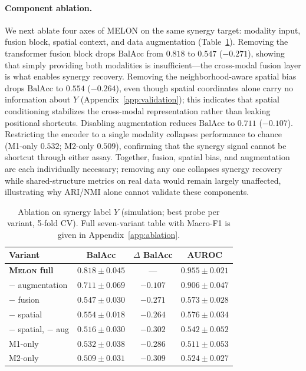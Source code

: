 \documentclass{article}
\theoremstyle{plain}
\theoremstyle{definition}
\newcommand{\melon}{\textsc{Melon}}
\begin{document}
\paragraph{Component ablation.}
We next ablate four axes of MELON on the same synergy target: modality input, fusion block, spatial context, and data augmentation (Table~\ref{tab:sim-ablation}). Removing the transformer fusion block drops $\text{BalAcc}$ from $0.818$ to $0.547$ ($-0.271$), showing that simply providing both modalities is insufficient—the cross-modal fusion layer is what enables synergy recovery. Removing the neighborhood-aware spatial bias drops $\text{BalAcc}$ to $0.554$ ($-0.264$), even though spatial coordinates alone carry no information about $Y$ (Appendix~\ref{app:validation}); this indicates that spatial conditioning stabilizes the cross-modal representation rather than leaking positional shortcuts. Disabling augmentation reduces $\text{BalAcc}$ to $0.711$ ($-0.107$). Restricting the encoder to a single modality collapses performance to chance (M1-only $0.532$; M2-only $0.509$), confirming that the synergy signal cannot be shortcut through either assay. Together, fusion, spatial bias, and augmentation are each individually necessary; removing any one collapses synergy recovery while shared-structure metrics on real data would remain largely unaffected, illustrating why ARI/NMI alone cannot validate these components.

\begin{table}[!htbp]
\centering
\caption{Ablation on synergy label $Y$ (simulation; best probe per variant, 5-fold CV). Full seven-variant table with Macro-F1 is given in Appendix~\ref{app:ablation}.}
\label{tab:sim-ablation}
\small
\begin{tabular}{lccc}
\toprule
Variant & BalAcc & $\Delta$ BalAcc & AUROC \\
\midrule
\textbf{\melon{} full}        & $\mathbf{0.818 \pm 0.045}$ & ---       & $\mathbf{0.955 \pm 0.021}$ \\
\quad $-$ augmentation         & $0.711 \pm 0.069$ & $-0.107$  & $0.906 \pm 0.047$ \\
\quad $-$ fusion               & $0.547 \pm 0.030$ & $-0.271$  & $0.573 \pm 0.028$ \\
\quad $-$ spatial              & $0.554 \pm 0.018$ & $-0.264$  & $0.576 \pm 0.034$ \\
\quad $-$ spatial, $-$ aug     & $0.516 \pm 0.030$ & $-0.302$  & $0.542 \pm 0.052$ \\
\quad M1-only                  & $0.532 \pm 0.038$ & $-0.286$  & $0.511 \pm 0.053$ \\
\quad M2-only                  & $0.509 \pm 0.031$ & $-0.309$  & $0.524 \pm 0.027$ \\
\bottomrule
\end{tabular}
\end{table}
\end{document}
